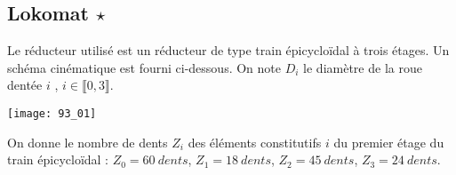 \normaltrue \difficilefalse \tdifficilefalse
\correctionfalse


\subsection*{Lokomat $\star$ \label{CIN:03:C2:06:93}}
\setcounter{question}{0}


\ifcorrection
\else
{}
\fi

\ifprof
\else


Le réducteur utilisé est un réducteur de type train épicycloïdal à trois étages. Un schéma 
cinématique est fourni ci-dessous. 
On note $D_i$ le diamètre de la roue dentée $i$ , $i\in \llbracket 0,3 \rrbracket$. 

\begin{center}
\texttt{[image: 93\_01]}
\end{center}
On donne le nombre de dents $Z_i$ des éléments constitutifs $i$ du premier étage du train épicycloïdal : 
 $Z_0 = \SI{60}{dents}$,  $Z_1 = \SI{18}{dents}$,  $Z_2 = \SI{45}{dents}$,  $Z_3 = \SI{24}{dents}$.
\fi

\ifprof
\else
\fi

\ifprof ~\\

\else
\fi

\ifprof
\else
{}
\fi